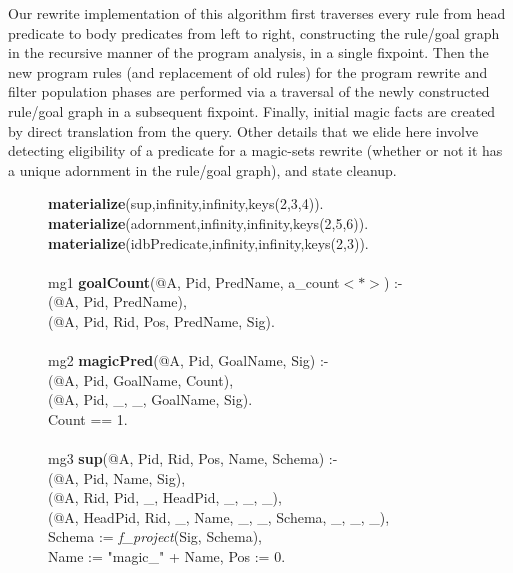 Our rewrite implementation of this algorithm first traverses every rule from
head predicate to body predicates from left to right, constructing the
rule/goal graph in the recursive manner of the program analysis, in a single
fixpoint.  Then the new program rules (and replacement of old rules) for the
program rewrite and filter population phases are performed via a traversal of
the newly constructed rule/goal graph in a subsequent fixpoint.  Finally,
initial magic facts are created by direct translation from the query.  Other
details that we elide here involve detecting eligibility of a predicate for a
magic-sets rewrite (whether or not it has a unique adornment in the rule/goal
graph), and state cleanup.

\begin{figure}
\ssp
\begin{boxedminipage}{\linewidth}
{\bf materialize}(sup,infinity,infinity,keys(2,3,4)). \\
{\bf materialize}(adornment,infinity,infinity,keys(2,5,6)). \\
{\bf materialize}(idbPredicate,infinity,infinity,keys(2,3)). \\
\\
mg1 {\bf goalCount}(@A, Pid, PredName, a\_count$<*>$) :- \\
(@A, Pid, PredName), \\
(@A, Pid, Rid, Pos, PredName, Sig). \\
\\
mg2 {\bf magicPred}(@A, Pid, GoalName, Sig) :- \\
(@A, Pid, GoalName, Count), \\
(@A, Pid, \_, \_, GoalName, Sig). \\
\datalogspace Count == 1. \\
\\
mg3 {\bf sup}(@A, Pid, Rid, Pos, Name, Schema) :- \\
(@A, Pid, Name, Sig), \\
(@A, Rid, Pid, \_, HeadPid, \_, \_, \_), \\
(@A, HeadPid, Rid, \_, Name, \_, \_, Schema, \_, \_, \_), \\
\datalogspace Schema := {\em f\_project}(Sig, Schema), \\
\datalogspace Name := "magic\_" + Name, Pos := 0. \\

\end{boxedminipage}
\end{figure}
